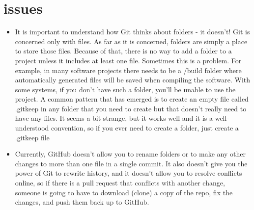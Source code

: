 \documentclass{article}
\begin{document}
\section{issues}
\begin{itemize}

\item It is important to understand how Git thinks about folders - it doesn’t! Git is concerned only with files. As far as it is concerned, folders are simply a place to store those files. Because of that, there is no way to add a folder to a project unless it includes at least one file. Sometimes this is a problem. For example, in many software projects there needs to be a /build folder where automatically generated files will be saved when compiling the software. With some systems, if you don’t have such a folder, you’ll be unable to use the project. A common pattern that has emerged is to create an empty file called .gitkeep in any folder that you need to create but that doesn’t really need to have any files. It seems a bit strange, but it works well and it is a well-understood convention, so if you ever need to create a folder, just create a .gitkeep file

\item Currently, GitHub doesn’t allow you to rename folders or to make any other changes to more than one file in a single commit. It also doesn’t give you the power of Git to rewrite history, and it doesn’t allow you to resolve conflicts online, so if there is a pull request that conflicts with another change, someone is going to have to download (clone) a copy of the repo, fix the changes, and push them back up to GitHub.


\end{itemize}
\end{document}
